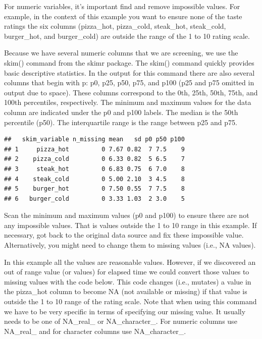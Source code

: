 \documentclass[
]{krantz}
\makeatletter
\newenvironment{Shaded}{\begin{snugshade}}{\end{snugshade}}
\newcommand{\KeywordTok}[1]{\textcolor[rgb]{0.27,0.27,0.27}{\textbf{#1}}}
\newcommand{\NormalTok}[1]{#1}
\newcommand{\OperatorTok}[1]{\textcolor[rgb]{0.43,0.43,0.43}{\textbf{#1}}}
\newcommand{\StringTok}[1]{\textcolor[rgb]{0.5,0.5,0.5}{#1}}
\newenvironment{kframe}{%
\medskip{}
\setlength{\fboxsep}{.8em}
 \def\at@end@of@kframe{}%
 \ifinner\ifhmode%
  \def\at@end@of@kframe{\end{minipage}}%
  \begin{minipage}{\columnwidth}%
 \fi\fi%
 \def\FrameCommand##1{\hskip\@totalleftmargin \hskip-\fboxsep
 \colorbox{shadecolor}{##1}\hskip-\fboxsep
     \hskip-\linewidth \hskip-\@totalleftmargin \hskip\columnwidth}%
 \MakeFramed {\advance\hsize-\width
   \@totalleftmargin\z@ \linewidth\hsize
   \@setminipage}}%
 {\par\unskip\endMakeFramed%
 \at@end@of@kframe}
\renewenvironment{Shaded}{\begin{kframe}}{\end{kframe}}
\makeatother
\begin{document}
For numeric variables, it's important find and remove impossible values. For example, in the context of this example you want to ensure none of the taste ratings the six columns (pizza\_hot, pizza\_cold, steak\_hot, steak\_cold, burger\_hot, and burger\_cold) are outside the range of the 1 to 10 rating scale.

Because we have several numeric columns that we are screening, we use the skim() command from the skimr package. The skim() command quickly provides basic descriptive statistics. In the output for this command there are also several columns that begin with p: p0, p25, p50, p75, and p100 (p25 and p75 omitted in output due to space). These columns correspond to the 0th, 25th, 50th, 75th, and 100th percentiles, respectively. The minimum and maximum values for the data column are indicated under the p0 and p100 labels. The median is the 50th percentile (p50). The interquartile range is the range between p25 and p75.

\begin{Shaded}
\end{Shaded}

\begin{verbatim}
##   skim_variable n_missing mean   sd p0 p50 p100
## 1     pizza_hot         0 7.67 0.82  7 7.5    9
## 2    pizza_cold         0 6.33 0.82  5 6.5    7
## 3     steak_hot         0 6.83 0.75  6 7.0    8
## 4    steak_cold         0 5.00 2.10  3 4.5    8
## 5    burger_hot         0 7.50 0.55  7 7.5    8
## 6   burger_cold         0 3.33 1.03  2 3.0    5
\end{verbatim}

Scan the minimum and maximum values (p0 and p100) to ensure there are not any impossible values. That is values outside the 1 to 10 range in this example. If necessary, got back to the original data source and fix these impossible value. Alternatively, you might need to change them to missing values (i.e., NA values).

In this example all the values are reasonable values. However, if we discovered an out of range value (or values) for elapsed time we could convert those values to missing values with the code below. This code changes (i.e., mutates) a value in the pizza\_hot column to become NA (not available or missing) if that value is outside the 1 to 10 range of the rating scale. Note that when using this command we have to be very specific in terms of specifying our missing value. It usually needs to be one of NA\_real\_ or NA\_character\_. For numeric columns use NA\_real\_ and for character columns use NA\_character\_.
\end{document}
